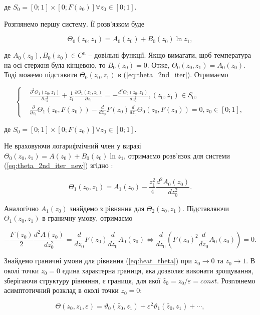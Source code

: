 де $S_0 = [0; 1] \times [0; F(z_0)] \forall z_0 \in [0; 1]$.

Розглянемо першу систему. Її розв’язком буде

$$
\Theta_0(z_0, z_1) = A_0(z_0) + B_0(z_0) \ln z_1,
$$

де $A_0(z_0), B_0(z_0) \in C^n$  – довільні функції. Якщо вимагати, щоб температура на осі стержня була кінцевою,
то $B_0(z_0) = 0$.
Отже, $\Theta_0(z_0, z_1) = A_0(z_0)$. Тоді можемо підставити $\Theta_0(z_0, z_1)$  в (\ref{eq:theta_2nd_iter}). Отримаємо

\begin{equation}
\label{eq:theta_2nd_iter_new}
\left\{
\begin{alignedat}{2}
&\frac{\partial^2\Theta_1(z_0, z_1)}{\partial z_1^2} + \frac{1}{z_1} \frac{\partial\Theta_1(z_0, z_1)}{\partial z_1}  =
-\frac{d^2\Theta_0(z_0, z_1)}{dz_0^2}, (z_0, z_1) \in S_0, \\
&\frac{\partial}{\partial z_1}\Theta_1(z_0, F(z_0)) - \frac{d}{dz_0}F(z_0)\frac{d}{dz_0}
\Theta_0(z_0, F(z_0))  =  0, z_0 \in [0; 1],
\end{alignedat}
\right.
\end{equation}

де $S_0 = [0; 1] \times [0; F(z_0)] \forall z_0 \in [0; 1]$.

Не враховуючи логарифмічний член у виразі $\Theta_0(z_0, z_1) = A(z_0) + B_0(z_0)\ln z_1$,
отримаємо розв’язок для системи (\ref{eq:theta_2nd_iter_new}) згідно \cite{Coul-Metody}:

$$
\Theta_1(z_0, z_1) = A_1(z_0) - \frac{z_1^2}{4}\frac{d^2 A_0(z_0)}{dz_0^2}.
$$

Аналогічно $A_1(z_0)$ знайдемо з рівняння для $\Theta_2(z_0, z_1)$. Підставляючи
$\Theta_1(z_0, z_1)$ в граничну умову, отримаємо

$$
-\frac{F(z_0)}{2}\frac{d^2A(z_0)}{dz_0^2} = \frac{d}{dz_0}F(z_0)\frac{d}{dz_0}A_0(z_0) \Leftrightarrow
\frac{d}{dz_0}\left(F(z_0)^2\frac{d}{dz_0}A_0(z_0)\right) = 0.
$$

Знайдемо граничні умови для рівняння (\ref{eq:heat_theta}) при $z_0\to0$ та $z_0\to1$.
В околі точки $z_0=0$ єдина характерна границя, яка дозволяє виконати
зрощування, зберігаючи структуру рівняння, є границя, для якої
$\tilde{z_0} = z_0 / \varepsilon = const$. Розглянемо асимптотичний розклад в околі точки $z_0=0$:

$$
\Theta(z_0, z_1, \varepsilon) = \vartheta_0(\tilde{z_0}, z_1) + \varepsilon^2 \vartheta_1(\tilde{z_0}, z_1) + \cdots,
$$

